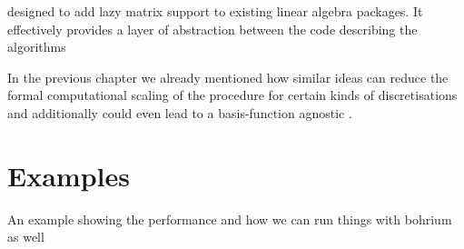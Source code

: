 designed to add lazy matrix support to existing
linear algebra packages.
It effectively provides a layer of abstraction between the code
describing the algorithms


In the previous chapter we already mentioned
how similar ideas can reduce the formal
computational scaling of the \SCF procedure
for certain kinds of discretisations
and additionally could even lead to a basis-function
agnostic \SCF.

\section{Examples}
An example showing the performance and how we can run things with bohrium as well
